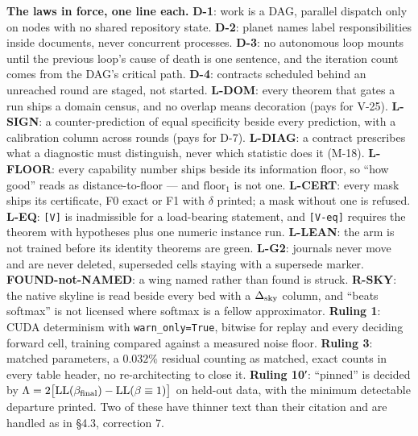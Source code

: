 \documentclass[11pt,a4paper]{article}
\theoremstyle{plain}
\theoremstyle{definition}
\theoremstyle{remark}
\begin{document}
\textbf{The laws in force, one line each.} \textbf{D-1}: work is a DAG,
parallel dispatch only on nodes with no shared repository state.
\textbf{D-2}: planet names label responsibilities inside documents,
never concurrent processes. \textbf{D-3}: no autonomous loop mounts
until the previous loop's cause of death is one sentence, and the
iteration count comes from the DAG's critical path. \textbf{D-4}:
contracts scheduled behind an unreached round are staged, not started.
\textbf{L-DOM}: every theorem that gates a run ships a domain census,
and no overlap means decoration (pays for V-25). \textbf{L-SIGN}: a
counter-prediction of equal specificity beside every prediction, with a
calibration column across rounds (pays for D-7). \textbf{L-DIAG}: a
contract prescribes what a diagnostic must distinguish, never which
statistic does it (M-18). \textbf{L-FLOOR}: every capability number
ships beside its information floor, so ``how good'' reads as
distance-to-floor --- and \(\mathrm{floor}_1\) is not one.
\textbf{L-CERT}: every mask ships its certificate, F0 exact or F1 with
\(\delta\) printed; a mask without one is refused. \textbf{L-EQ}:
\texttt{{[}V{]}} is inadmissible for a load-bearing statement, and
\texttt{{[}V-eq{]}} requires the theorem with hypotheses plus one
numeric instance run. \textbf{L-LEAN}: the arm is not trained before its
identity theorems are green. \textbf{L-G2}: journals never move and are
never deleted, superseded cells staying with a supersede marker.
\textbf{FOUND-not-NAMED}: a wing named rather than found is struck.
\textbf{R-SKY}: the native skyline is read beside every bed with a
\(\Delta_{\rm sky}\) column, and ``beats softmax'' is not licensed where
softmax is a fellow approximator. \textbf{Ruling 1}: CUDA determinism
with \texttt{warn\_only=True}, bitwise for replay and every deciding
forward cell, training compared against a measured noise floor.
\textbf{Ruling 3}: matched parameters, a \(0.032\%\) residual counting
as matched, exact counts in every table header, no re-architecting to
close it. \textbf{Ruling 10′}: ``pinned'' is decided by
\(\Lambda=2\big[\mathrm{LL}(\beta_{\rm final})-\mathrm{LL}(\beta\equiv
1)\big]\) on held-out data, with the minimum detectable departure
printed. Two of these have thinner text than their citation and are
handled as in §4.3, correction 7.
\end{document}
